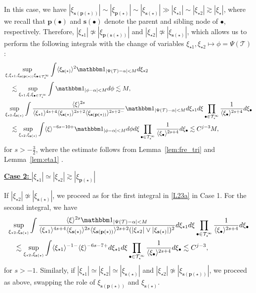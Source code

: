 \documentclass[%
11pt,  reqno]{amsart}
\newcommand{\5}{\textup{V}}
\newcommand{\noi}{\noindent}
\newcommand{\ind}{\mathbbm 1}
\newcommand{\les}{\lesssim}
\theoremstyle{remark}
\newcommand{\bul}{\bullet}
\newcommand{\TT}{\mathcal{T}}
\newcommand{\al}{\alpha}
\newcommand{\pb}{\mathbf{p}}
\newcommand{\sbf}{\mathbf{s}}
\newcommand{\ges}{\gtrsim}
\newcommand{\jb}[1]
{\langle #1 \rangle}
\numberwithin{equation}{section}
\numberwithin{theorem}{section}
\begin{document}
In this case, we have $|\xi_{\sbf(\pb(\star))}| \sim |\xi_{\pb(\star)}| \sim |\xi_{\sbf(\star)}| \gg |\xi_{\star1}| \sim |\xi_{\star2}| \ges |\xi_\star|$, where we recall that $\pb(\bul)$ and $\sbf(\bul)$ denote the parent and sibling node of $\bul$, respectively. Therefore, $|\xi_{\star1}| \not \simeq |\xi_{\pb(\sbf(\star))}| $ and $|\xi_{\star2}| \not \simeq |\xi_{\sbf(\star)}|$, which allows us to perform the following integrals with the change of variables $\xi_{\star1}, \xi_{\star2} \mapsto \phi = \Psi(\TT)$:
\begin{align}\label{L23a}
    & \sup_{ \xi,\xi_{\star1}, \xi_{\sbf(\pb(\star))} \xi_{\bul\in \TT^\infty_\star}} 
    \int 
    \jb{\xi_{\sbf(\star)}}^2 
    \ind_{|\Psi(\TT)-\al|< M } 
    d\xi_{\star2} 
    \\
    &
    \quad 
    \les 
    \sup_{\xi_{\star1}, \xi, \xi_{\bul\in \TT^\infty_\star}} 
    \int 
    \ind_{|\phi-\al|  < M} d\phi 
    \les M
    , 
    \\
    &
    \sup_{\xi_{\star2}, \xi_{\sbf(\star)}} 
    \int 
    \frac{\jb{\xi}^{2s}   }{ \jb{\xi_{\star1}}^{4s+4} \jb{\xi_{\sbf(\star)}}^{2s+2} \jb{\xi_{\sbf(\pb(\star))}}^{2s+2-} }
    \ind_{|\Psi(\TT)-\al|< M } 
    d\xi_{\star1} d\xi 
    \prod_{\bul\in\TT^\infty_\star} \frac{1}{\jb{\xi_\bul}^{2s+4}} d\xi_\bul
    \\
    &
    \quad 
    \les 
    \sup_{\xi_{\star2}, \xi_{\sbf(\star)}} 
    \int \jb{\xi}^{-6s-10+} \ind_{|\phi-\al|< M} d\phi d\xi \prod_{\bul\in\TT^\infty_\star} \frac{1}{\jb{\xi_\bul}^{2s+4}} d\xi_\bul
    \les C^{j-3 } M 
    ,
\end{align}
for $s>-\frac32$, where the estimate follows from Lemma~\ref{lem:fre_tri} and Lemma~\ref{lem:eta1}
.


\smallskip
\noi
\underline{\textbf{Case 2:} $|\xi_{\star1}| \simeq |\xi_{\star2}| \ges |\xi_{\pb(\star)}|$}

If $|\xi_{\star2}| \not\simeq |\xi_{\sbf(\star)}|$, we proceed as for the first integral in \eqref{L23a} in Case 1. For the second integral, we have
\begin{align}\label{L23b}
&
    \sup_{\xi_{\star2}, \xi_{\sbf(\star)}} 
    \int 
    \frac{\jb{\xi}^{2s} \ind_{|\Psi(\TT)-\al|< M }   }{ \jb{\xi_{\star1}}^{4s+4} \jb{\xi_{\sbf(\star)}}^{2s} \jb{\xi_{\sbf(\pb(\star))}}^{2s+2} (|\xi_{\star2}| \lor |\xi_{\sbf(\star)}|)^2  }
    d\xi_{\star1} d\xi 
    \prod_{\bul\in\TT^\infty_\star} \frac{1}{\jb{\xi_\bul}^{2s+4}} d\xi_\bul
    \\
    &
    \quad 
    \les 
    \sup_{\xi_{\star2}, \xi_{\sbf(\star)}} 
    \int \jb{\xi_{\star1}}^{-1-} \jb{\xi}^{-6s-7+} d\xi_{\star1} d\xi \prod_{\bul\in\TT^\infty_\star} \frac{1}{\jb{\xi_\bul}^{2s+4}} d\xi_\bul
    \les C^{j-3 } , 
\end{align}
for $s> -1$. 
% 
% 
Similarly, if $|\xi_{\star1}| \simeq |\xi_{\star2}| \simeq |\xi_{\sbf(\star)}|$ and $|\xi_{\star2}| \not\simeq |\xi_{\sbf(\pb(\star))}|$, we proceed as above, swapping the role of $\xi_{\sbf(\pb(\star))}$ and $\xi_{\sbf(\star)}$. 
\end{document}
